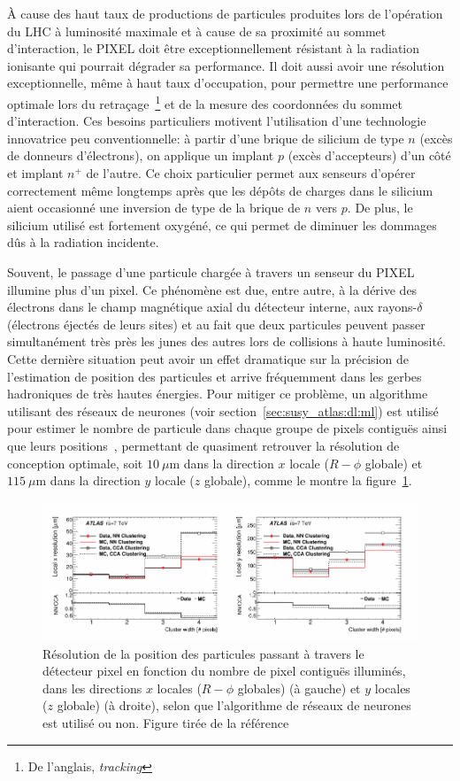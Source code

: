 À cause des haut taux de productions de particules produites lors de
l'opération du LHC à luminosité maximale et à cause de sa proximité au
sommet d'interaction, le PIXEL doit être exceptionnellement résistant
à la radiation ionisante qui pourrait dégrader sa performance. Il doit
aussi avoir une résolution exceptionnelle, même à haut taux
d'occupation, pour permettre une performance optimale lors du
retraçage~\footnote{De l'anglais, \emph{tracking}} et de la mesure des
coordonnées du sommet d'interaction. Ces besoins particuliers motivent
l'utilisation d'une technologie innovatrice peu conventionnelle: à
partir d'une brique de silicium de type $n$ (excès de donneurs
d'électrons), on applique un implant $p$ (excès d'accepteurs) d'un
côté et implant $n^+$ de l'autre. Ce choix particulier permet aux
senseurs d'opérer correctement même longtemps après que les dépôts de
charges dans le silicium aient occasionné une inversion de type de la
brique de $n$ vers $p$. De plus, le silicium utilisé est fortement
oxygéné, ce qui permet de diminuer les dommages dûs à la radiation
incidente.

Souvent, le passage d'une particule chargée à travers un senseur du
PIXEL illumine plus d'un pixel. Ce phénomène est due, entre autre, à
la dérive des électrons dans le champ magnétique axial du détecteur
interne, aux rayons-$\delta$ (électrons éjectés de leurs sites) et au
fait que deux particules peuvent passer simultanément très près les
junes des autres lors de collisions à haute luminosité. Cette dernière
situation peut avoir un effet dramatique sur la précision de
l'estimation de position des particules et arrive fréquemment dans les
gerbes hadroniques de très hautes énergies. Pour mitiger ce problème,
un algorithme utilisant des réseaux de neurones (voir
section~\ref{sec:susy_atlas:dl:ml}) est utilisé pour estimer le nombre
de particule dans chaque groupe de pixels contiguës ainsi que leurs
positions~\cite{collaboration_neural_2014}, permettant de quasiment
retrouver la résolution de conception optimale, soit $10~\mu$m dans la
direction $x$ locale ($R-\phi$ globale) et $115~\mu$m dans la
direction $y$ locale ($z$ globale), comme le montre la
figure~\ref{fig:pixel_acc}.

\begin{figure}
  \centering
  \includegraphics{pixel_acc.pdf}
  \caption{Résolution de la position des particules passant à travers
    le détecteur pixel en fonction du nombre de pixel contiguës
    illuminés, dans les directions $x$ locales ($R-\phi$ globales) (à
    gauche) et $y$ locales ($z$ globale) (à droite), selon que
    l'algorithme de réseaux de neurones est utilisé ou non. Figure
    tirée de la référence~\cite{collaboration_neural_2014}}
  \label{fig:pixel_acc}
\end{figure}

